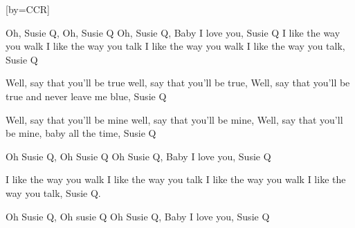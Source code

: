 

[by=CCR]


\beginverse
Oh, Susie Q, Oh, Susie Q
Oh, Susie Q, Baby I love you, Susie Q
I like the way you walk
I like the way you talk
I like the way you walk I like the way you talk, Susie Q
\endverse

\beginverse
Well, say that you'll be true
well, say that you'll be true,
Well, say that you'll be true and never leave me blue, Susie Q
\endverse

\beginverse
Well, say that you'll be mine
well, say that you'll be mine,
Well, say that you'll be mine, baby all the time, Susie Q
\endverse

\beginverse
Oh Susie Q, Oh Susie Q
Oh Susie Q, Baby I love you, Susie Q
\endverse

\beginverse
I like the way you walk
I like the way you talk
I like the way you walk I like the way you talk, Susie Q.
\endverse

\beginverse
Oh Susie Q, Oh susie Q
Oh Susie Q, Baby I love you, Susie Q
\endverse



\chordson
\endsong

